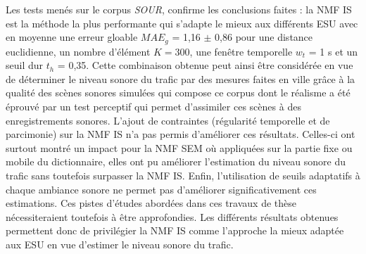Les tests menés sur le corpus \textit{SOUR}, confirme les conclusions faites : la NMF IS est la méthode la plus performante qui s'adapte le mieux aux différents ESU avec en moyenne une erreur gloable $MAE_g$ = 1,16 $\pm$ 0,86 pour une distance euclidienne, un nombre d'élément $K = 300$, une fenêtre temporelle $w_t$ = 1 s et un seuil dur $t_h$ = 0,35. Cette combinaison obtenue peut ainsi être considérée en vue de déterminer le niveau sonore du trafic par des mesures faites en ville grâce à la qualité des scènes sonores simulées qui compose ce corpus dont le réalisme a été éprouvé par un test perceptif qui permet d'assimiler ces scènes à des enregistrements sonores.
L'ajout de contraintes (régularité temporelle et de parcimonie) sur la NMF IS n'a pas permis d'améliorer ces résultats. Celles-ci ont surtout montré un impact pour la NMF SEM où appliquées sur la partie fixe ou mobile du dictionnaire, elles ont pu améliorer l'estimation du niveau sonore du trafic sans toutefois surpasser la NMF IS. Enfin, l'utilisation de seuils adaptatifs à chaque ambiance sonore ne permet pas d'améliorer significativement ces estimations. Ces pistes d'études abordées dans ces travaux de thèse nécessiteraient toutefois à être approfondies.
Les différents résultats obtenues permettent donc de privilégier la NMF IS comme l'approche la mieux adaptée aux ESU en vue d'estimer le niveau sonore du trafic. 


